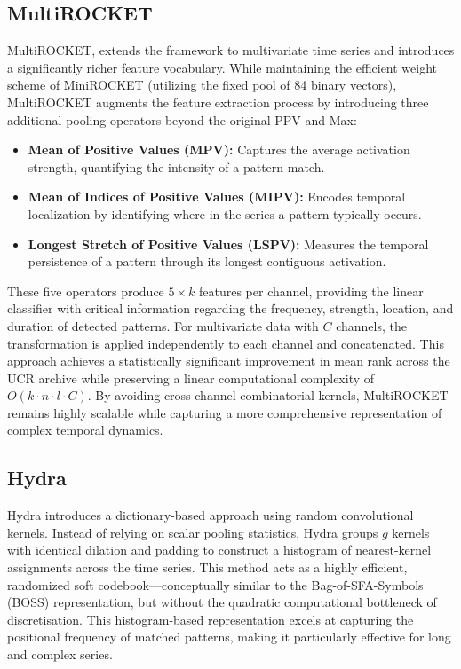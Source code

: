 \documentclass[conference]{IEEEtran}
\begin{document}
\subsection{MultiROCKET}
MultiROCKET, extends the framework to multivariate time series and introduces a significantly richer feature vocabulary. While maintaining the efficient weight scheme of MiniROCKET (utilizing the fixed pool of 84 binary vectors), MultiROCKET augments the feature extraction process by introducing three additional pooling operators beyond the original PPV and Max:
\begin{itemize}
    \item \textbf{Mean of Positive Values (MPV):} Captures the average activation strength, quantifying the intensity of a pattern match.
    \item \textbf{Mean of Indices of Positive Values (MIPV):} Encodes temporal localization by identifying where in the series a pattern typically occurs.
    \item \textbf{Longest Stretch of Positive Values (LSPV):} Measures the temporal persistence of a pattern through its longest contiguous activation.
\end{itemize}
These five operators produce $5 \times k$ features per channel, providing the linear classifier with critical information regarding the frequency, strength, location, and duration of detected patterns. For multivariate data with $C$ channels, the transformation is applied independently to each channel and concatenated. This approach achieves a statistically significant improvement in mean rank across the UCR archive while preserving a linear computational complexity of $O(k \cdot n \cdot l \cdot C)$. By avoiding cross-channel combinatorial kernels, MultiROCKET remains highly scalable while capturing a more comprehensive representation of complex temporal dynamics.

\subsection{Hydra}
Hydra introduces a dictionary-based approach using random convolutional kernels. Instead of relying on scalar pooling statistics, Hydra groups $g$ kernels with identical dilation and padding to construct a histogram of nearest-kernel assignments across the time series. This method acts as a highly efficient, randomized soft codebook—conceptually similar to the Bag-of-SFA-Symbols (BOSS) representation, but without the quadratic computational bottleneck of discretisation. This histogram-based representation excels at capturing the positional frequency of matched patterns, making it particularly effective for long and complex series.
\end{document}
